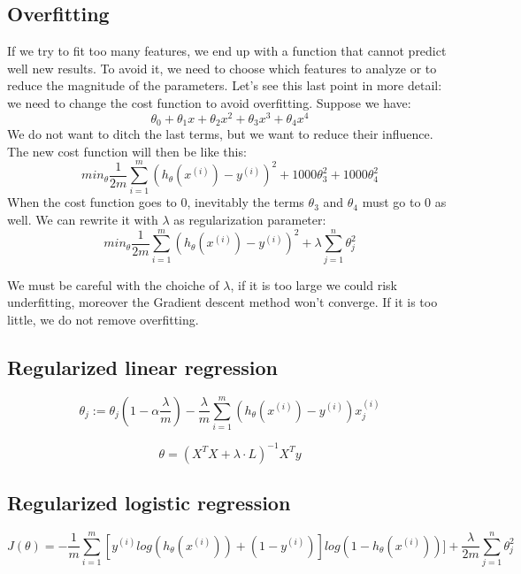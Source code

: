 \documentclass{article}
\begin{document}
\subsection{Overfitting}
If we try to fit too many features, we end up with a function that cannot predict
well new results. To avoid it, we need to choose which features to analyze or to
reduce the magnitude of the parameters.
Let's see this last point in more detail: we need to change the cost function to
avoid overfitting.
Suppose we have:
$$ \theta_0 + \theta_1x + \theta_2x^2  + \theta_3x^3 + \theta_4x^4 $$
We do not want to ditch the last terms, but we want to reduce their influence.
The new cost function will then be like this:
$$ min_{\theta}\frac{1}{2m}\sum_{i=1}^{m}(h_\theta(x^{(i)})-y^{(i)})^2 +
1000 \theta_3^2 + 1000 \theta_4^2 $$
When the cost function goes to 0, inevitably the terms $\theta_3$ and $\theta_4$
must go to 0 as well.
We can rewrite it with $\lambda$ as regularization parameter:
$$ min_{\theta}\frac{1}{2m}\sum_{i=1}^{m}(h_\theta(x^{(i)})-y^{(i)})^2 + \lambda
\sum_{j=1}^n\theta_j^2$$

We must be careful with the choiche of $\lambda$, if it is too large we could
risk underfitting, moreover the Gradient descent method won't converge.
If it is too little, we do not remove overfitting.

\subsection{Regularized linear regression}

$$\theta_j := \theta_j(1-\alpha\frac{\lambda}{m})-
\frac{\lambda}{m}\sum_{i=1}^m(h_\theta(x^{(i)}) - y^{(i)})x_j^{(i)} $$

$$ \theta = (X^T X + \lambda \cdot L)^{-1} X^T y $$

\subsection{Regularized logistic regression}

$$ J(\theta) = -\frac{1}{m}\sum_{i=1}^m[y^{(i)}log(h_\theta(x^{(i)})) +
(1-y^{(i)})]log(1-h_\theta(x^{(i)}))] + \frac{\lambda}{2m}\sum_{j=1}^n\theta_j^2$$
\end{document}
